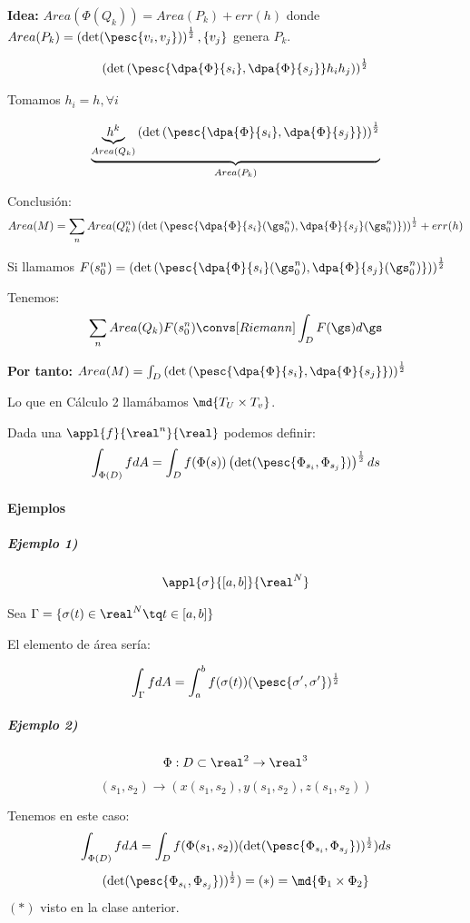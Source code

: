 \textbf{Idea:} $Area(\Phi(Q_k)) = Area(P_k) + err(h)$ donde $Area(P_k) = \left(\det (\pesc{v_i,v_j})\right)^{\frac{1}{2}}, \{v_j\}$ genera $P_k$.


\[\left(\det\left(\pesc{\dpa{\Phi}{s_i},\dpa{\Phi}{s_j}}h_ih_j\right)\right)^{\frac{1}{2}}\]

Tomamos $h_i = h, \forall i$

\[\underbrace{\underbrace{h^k}_{Area(Q_k)} \left(\det\left(\pesc{\dpa{\Phi}{s_i},\dpa{\Phi}{s_j}}\right)\right)^{\frac{1}{2}}}_{Area(P_k)}\]

Conclusión: \[Area(M) = \sum_n Area(Q_k^n) \left(\det\left(\pesc{\dpa{\Phi}{s_i}(\gs_0^n),\dpa{\Phi}{s_j}(\gs_0^n)}\right)\right)^{\frac{1}{2}} + err(h)\]

Si llamamos $F(s_0^n) = \left(\det\left(\pesc{\dpa{\Phi}{s_i}(\gs_0^n),\dpa{\Phi}{s_j}(\gs_0^n)}\right)\right)^{\frac{1}{2}}$ 

Tenemos: \[\sum_n Area(Q_k) F(s_0^n) \convs[Riemann] \int_D F(\gs)d\gs\]

\textbf{Por tanto:} $Area(M) = \int_D \left(\det\left(\pesc{\dpa{\Phi}{s_i},\dpa{\Phi}{s_j}}\right)\right)^{\frac{1}{2}}$

Lo que en Cálculo 2 llamábamos $\md{T_U\times T_v}$.


Dada una $\appl{f}{\real^n}{\real}$ podemos definir: \[\int_{\Phi(D)}f dA = \int_{D}f(\Phi(s)) \left(\det(\pesc{\Phi_{s_i},\Phi_{s_j}})\right)^{\frac{1}{2}} ds\]

\paragraph{Ejemplos}

\subparagraph{Ejemplo 1)}

\[\appl{\sigma}{[a,b]}{\real^N}\]

Sea $\Gamma = \{\sigma(t)\in\real^N\tq t\in[a,b]\}$

El elemento de área sería:

\[\int_{\Gamma} fdA = \int_a^bf(\sigma(t)) (\pesc{\sigma',\sigma'})^{\frac{1}{2}}\]


\subparagraph{Ejemplo 2)}

\[
\Phi : D\subset\real^2\rightarrow \real^3\]
\[(s_1,s_2)\rightarrow (x(s_1,s_2),y(s_1,s_2),z(s_1,s_2))\]

Tenemos en este caso:
\[\int_{\Phi(D)}fdA = \int_D f(\Phi(s_1,s_2)) (\det(\pesc{\Phi_{s_i},\Phi_{s_j}}))^{\frac{1}{2}})ds\]
\[(\det(\pesc{\Phi_{s_i},\Phi_{s_j}}))^{\frac{1}{2}}) = (*) = \md{\Phi_1 \times \Phi_2}\]
$(*)$ visto en la clase anterior.

